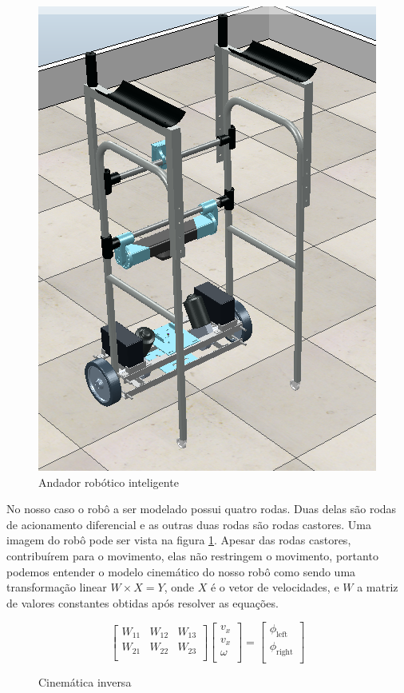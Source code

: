 \begin{figure}[H]
    \centering
    \includegraphics[scale=0.4]{figuras/smart_walker.png}
    \caption{Andador robótico inteligente}
    \label{fig:andador:robotico:inteligente}
\end{figure}


No nosso caso o robô a ser modelado possui quatro rodas. Duas delas são
rodas de acionamento diferencial e as outras duas rodas são rodas castores.
Uma imagem do robô pode ser vista na figura \ref{fig:andador:robotico:inteligente}.
Apesar das rodas castores, contribuírem para o movimento, elas não restringem
o movimento, portanto podemos entender o modelo cinemático do nosso robô
como sendo uma transformação linear $W \times X = Y$, onde $X$ é o vetor
de velocidades, e $W$ a matriz de valores constantes obtidas após resolver
as equações.

\begin{figure}[H]
    \[
    \begin{bmatrix}
        W_{11} &  W_{12} & W_{13} \\
        W_{21} &  W_{22} & W_{23} \\
    \end{bmatrix}
    \begin{bmatrix}
        v_x \\
        v_x \\
        \omega \\
    \end{bmatrix}
    =
    \begin{bmatrix}
        \phi_{\text{left}} \\
        \phi_{\text{right}} \\
    \end{bmatrix}
\]
    \caption{Cinemática inversa}
\end{figure}

